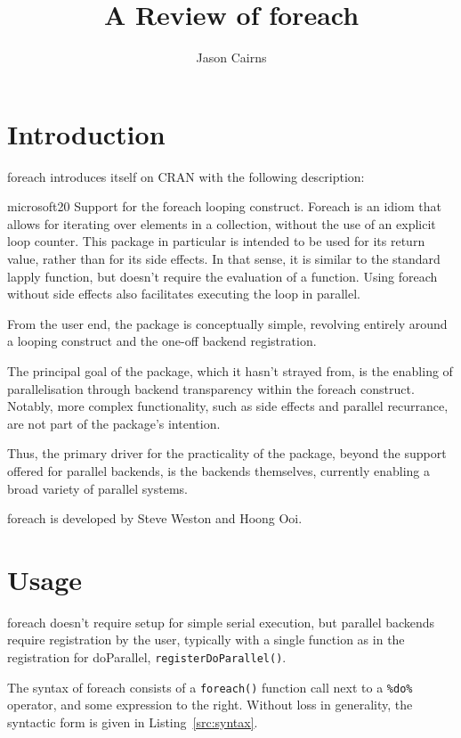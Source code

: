 \documentclass[a4paper,10pt]{article}
\begin{document}
\title{A Review of foreach}
\author{Jason Cairns}
  
\maketitle{}

\section{Introduction}
\label{sec:introduction}

foreach introduces itself on CRAN with the following description:
\begin{displaycquote}{microsoft20}
	Support for the foreach looping construct. Foreach is an idiom that
	allows for iterating over elements in a collection, without the use
	of an explicit loop counter. This package in particular is intended
	to be used for its return value, rather than for its side effects.
	In that sense, it is similar to the standard lapply function, but
	doesn't require the evaluation of a function. Using foreach without
	side effects also facilitates executing the loop in parallel.
\end{displaycquote}

From the user end, the package is conceptually simple, revolving
entirely around a looping construct and the one-off backend
registration.

The principal goal of the package, which it hasn't strayed from, is
the enabling of parallelisation through backend transparency within
the foreach construct. Notably, more complex functionality, such as
side effects and parallel recurrance, are not part of the package's
intention.

Thus, the primary driver for the practicality of the package, beyond
the support offered for parallel backends, is the backends themselves,
currently enabling a broad variety of parallel systems.

foreach is developed by Steve Weston and Hoong Ooi.

\section{Usage}
\label{sec:usage}

foreach doesn't require setup for simple serial execution, but
parallel backends require registration by the user, typically with a
single function as in the registration for doParallel,
\texttt{registerDoParallel()}.

The syntax of foreach consists of a \texttt{foreach()} function call
next to a \texttt{\%do\%} operator, and some expression to the
right\cite{weston19:_using}. Without loss in generality, the syntactic
form is given in Listing~\ref{src:syntax}.
\end{document}
